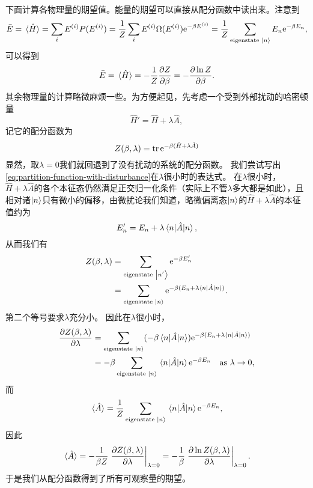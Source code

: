 \documentclass[hyperref, UTF8, a4paper]{ctexart}
\newcommand*{\ee}{\mathrm{e}}
\begin{document}
下面计算各物理量的期望值。能量的期望可以直接从配分函数中读出来。注意到
\[
    \bar{E} = \expval*{\hat{H}} = \sum_i E^{(i)} P(E^{(i)}) = \frac{1}{Z} \sum_i E^{(i)} \Omega(E^{(i)}) \ee^{- \beta E^{(i)}} = \frac{1}{Z} \sum_\text{eigenstate $\ket{n}$} E_n \ee^{-\beta E_n} ,
\]
可以得到
\begin{equation}
    \bar{E} = \expval*{\hat{H}} = - \frac{1}{Z} \pdv{Z}{\beta} = - \pdv{\ln Z}{\beta}.
    \label{eq:canonical-expectation-of-energy}
\end{equation}
其余物理量的计算略微麻烦一些。为方便起见，先考虑一个受到外部扰动的哈密顿量
\begin{equation}
    \hat{H}' = \hat{H} + \lambda \hat{A},
\end{equation}
记它的配分函数为
\begin{equation}
    Z(\beta, \lambda) = \trace \ee^{-\beta (\hat{H} + \lambda \hat{A})}
    \label{eq:partition-function-with-disturbance}
\end{equation}
显然，取$\lambda = 0$我们就回退到了没有扰动的系统的配分函数。
我们尝试写出\eqref{eq:partition-function-with-disturbance}在$\lambda$很小时的表达式。
在$\lambda$很小时，$\hat{H} + \lambda \hat{A}$的各个本征态仍然满足正交归一化条件（实际上不管$\lambda$多大都是如此），且相对诸$\ket{n}$只有微小的偏移，由微扰论我们知道，略微偏离态$\ket{n}$的$\hat{H} + \lambda \hat{A}$的本征值约为
\[
    E'_n = E_n + \lambda \mel{n}{\hat{A}}{n},
\]
从而我们有
\[
    \begin{aligned}
        Z(\beta, \lambda) &= \sum_{\text{eigenstate $\ket{n'}$}} \ee^{- \beta E'_n} \\
        &= \sum_{\text{eigenstate $\ket{n}$}} \ee^{- \beta (E_n + \lambda \mel{n}{\hat{A}}{n})}.
    \end{aligned}
\]
第二个等号要求$\lambda$充分小。
因此在$\lambda$很小时，
\[
    \begin{aligned}
        \pdv{Z(\beta, \lambda)}{\lambda} &= \sum_{\text{eigenstate $\ket{n}$}} (-\beta \mel{n}{\hat{A}}{n}) \ee^{-\beta (E_n + \lambda \mel{n}{\hat{A}}{n})} \\
        &= - \beta \sum_{\text{eigenstate $\ket{n}$}} \mel{n}{\hat{A}}{n} \ee^{- \beta E_n} \quad \text{as $\lambda \to 0$},
    \end{aligned}
\]
而
\[
    \expval*{\hat{A}} = \frac{1}{Z} \sum_\text{eigenstate $\ket{n}$} \mel{n}{\hat{A}}{n} \ee^{- \beta E_n},
\]
因此
\begin{equation}
    \expval*{\hat{A}} = - \frac{1}{\beta Z} \eval{\pdv{Z(\beta, \lambda)}{\lambda}}_{\lambda = 0} = - \frac{1}{\beta} \eval{\pdv{\ln Z(\beta, \lambda)}{\lambda}}_{\lambda=0}.
\end{equation}
于是我们从配分函数得到了所有可观察量的期望。
\end{document}
